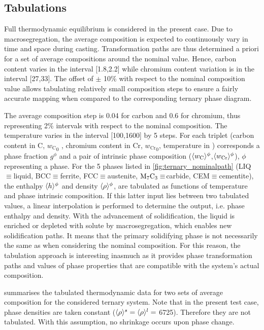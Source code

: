 \subsection{Tabulations}

Full thermodynamic equilibrium is considered in the present case. Due to macrosegregation, 
the average composition is expected to continuously vary in time and space during casting. 
Transformation paths are thus determined a priori for a set of average compositions around 
the nominal value. Hence, carbon content varies in the interval [1.8,2.2]\si{\ucomposition} 
while chromium content variation is in the interval [27,33]\si{\ucomposition}. 
The offset of $\pm$ 10\%  with 
respect to the nominal composition value allows tabulating relatively small composition steps
to ensure a fairly accurate mapping when compared to the corresponding ternary phase diagram. 

The average composition step is \SI{0.04}{\ucomposition} for carbon and \SI{0.6}{\ucomposition} for chromium, thus representing 2\% 
intervals with respect to the nominal composition. The temperature varies in the interval 
[100,1600]\si{\udegC} by \SI{5}{\udegC} steps. For each triplet (carbon content 
in \si{\ucomposition} C, ${w_\text{C}}_0$ , chromium content in \si{\ucomposition} Cr,  ${w_\text{Cr}}_0$, temperature in \si{\udegK}) 
corresponds a phase fraction $g^\phi$ and a pair of intrinsic phase composition ($\langle w_\text{C} \rangle^\phi$,$\langle w_\text{Cr} \rangle^\phi$), $\phi$ representing a phase. For the 5 
phases listed in \cref{fig:ternary_nominalpath} (LIQ$\equiv$liquid, BCC$\equiv$ferrite, FCC$\equiv$austenite, 
$\text{M}_7 \text{C}_3 \equiv$carbide, CEM$\equiv$cementite), the enthalpy $\langle h \rangle^{\phi} $ and density $\langle \rho \rangle^{\phi} $, are tabulated 
as functions of temperature and phase intrinsic composition. If this latter input lies between two tabulated 
values, a linear interpolation is performed to determine the output, i.e. phase enthalpy and density. With 
the advancement of solidification, the liquid is enriched or depleted with solute by macrosegregation, which enables new 
solidification paths. It means that the primary solidifying phase is not necessarily the same as when considering 
the nominal composition. For this reason, the tabulation approach is interesting inasmuch as it provides phase 
transformation paths and values of phase properties that are compatible with the system’s actual composition. 

 summarises the tabulated thermodynamic data for two sets of average composition for the considered 
ternary system. Note that in the present test case, phase densities are taken constant ($\langle \rho \rangle^s=\langle \rho \rangle^l=$ \SI{6725}{\udensity}). 
Therefore they are not tabulated. With this assumption, no shrinkage occurs upon phase change.


